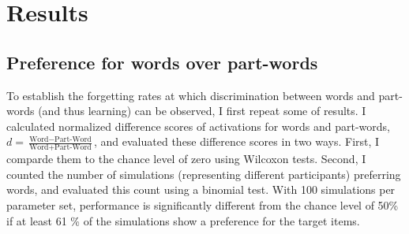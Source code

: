 \documentclass[
]{article}
\begin{document}
\clearpage

\hypertarget{results}{%
\section{Results}\label{results}}

\hypertarget{preference-for-words-over-part-words}{%
\subsection{Preference for words over
part-words}\label{preference-for-words-over-part-words}}

To establish the forgetting rates at which discrimination between words
and part-words (and thus learning) can be observed, I first repeat some
of \citep{Endress-TP-Model} results. I calculated normalized difference
scores of activations for words and part-words,
\(d = \frac{\text{Word} - \text{Part-Word}}{\text{Word} + \text{Part-Word}}\),
and evaluated these difference scores in two ways. First, I comparde
them to the chance level of zero using Wilcoxon tests. Second, I counted
the number of simulations (representing different participants)
preferring words, and evaluated this count using a binomial test. With
100 simulations per parameter set, performance is significantly
different from the chance level of 50\% if at least 61 \% of the
simulations show a preference for the target items.
\end{document}
